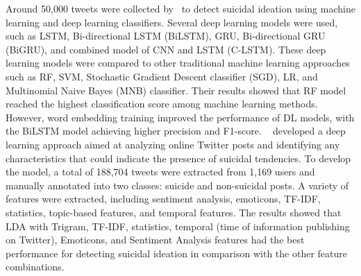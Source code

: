 \documentclass[sn-mathphys,Numbered]{sn-jnl}%
\begin{document}
Around 50,000 tweets were collected by~\citet{technologies10030057} to detect suicidal ideation using machine learning and deep learning classifiers. %
Several deep learning models were used, such as LSTM, Bi-directional LSTM (BiLSTM), GRU, Bi-directional GRU (BiGRU), and combined model of CNN and LSTM (C-LSTM). These deep learning models were compared to other traditional machine learning approaches such as RF, SVM, Stochastic Gradient Descent classifier (SGD), LR, and Multinomial Naive Bayes (MNB) classifier. Their results showed that RF model reached the highest classification score among machine learning methods. However, word embedding training improved the performance of DL models, with the BiLSTM model achieving higher precision and F1-score. 
~\citet{9753295} developed a deep learning approach aimed at analyzing online Twitter posts and identifying any characteristics that could indicate the presence of suicidal tendencies. To develop the model, a total of 188,704 tweets were extracted from 1,169 users and manually annotated into two classes: suicide and non-suicidal posts. A variety of features were extracted, including sentiment analysis, emoticons, TF-IDF, statistics, topic-based features, and temporal features. The results showed that LDA with Trigram, TF-IDF, statistics, temporal (time of information publishing on Twitter), Emoticons, and Sentiment Analysis features had the best performance for detecting suicidal ideation in comparison with the other feature combinations.%
\end{document}
